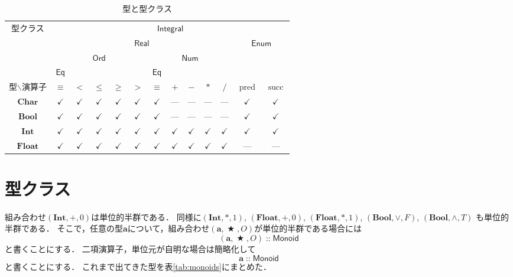 \documentclass[twocolumn]{jsbook}
\newcommand{\hsklType}[1]{\textbf{#1}}
\newcommand{\hsklTypeclass}[1]{\mathsf{#1}}
\DeclareMathOperator{\hsklPred}{pred}
\DeclareMathOperator{\hsklSucc}{succ}
\newcommand{\hsklBool}{\hsklType{Bool}}
\newcommand{\hsklChar}{\hsklType{Char}}
\newcommand{\hsklEnum}{\hsklTypeclass{Enum}}
\newcommand{\hsklInt}{\hsklType{Int}}
\newcommand{\hsklIntegral}{\hsklTypeclass{Integral}}
\newcommand{\hsklEq}{\hsklTypeclass{Eq}}
\newcommand{\hsklFloat}{\hsklType{Float}}
\newcommand{\hsklMonoid}{\hsklTypeclass{Monoid}}
\newcommand{\hsklNum}{\hsklTypeclass{Num}}
\newcommand{\hsklOrd}{\hsklTypeclass{Ord}}
\newcommand{\hsklReal}{\hsklTypeclass{Real}}
\DeclareMathOperator{\mathAnyBinaryOperator}{\bigstar}
\DeclareMathOperator{\mathIn}{::}
\newcommand{\mathMonoid}[3]{(#1,#2,#3)}
\begin{document}
\begin{table*}
\caption{型と型クラス}
\label{tab:type-and-typeclass}
\begin{center}
\begin{tabular}{||c||c|c|c|c|c|c|c|c|c|c|c|c||}
\hline
\multirow{4}{*}{型クラス}
    &\multicolumn{12}{|c||}{$\hsklIntegral$}\\
\cline{2-13}
\multirow{3}{*}{}
    &\multicolumn{10}{|c|}{$\hsklReal$}
    &\multicolumn{2}{|c||}{$\hsklEnum$}\\
\cline{2-11}
\multirow{2}{*}{}
    &\multicolumn{5}{|c|}{$\hsklOrd$}
    &\multicolumn{5}{|c|}{$\hsklNum$}
    &\multicolumn{2}{|c||}{ }\\
\cline{2-2}\cline{7-7}
{ }
    &$\hsklEq$
    &\multicolumn{4}{|c|}{ }
    &$\hsklEq$
    &\multicolumn{4}{|c|}{ }
    &\multicolumn{2}{|c||}{ }\\
\hline\hline
型$\backslash$演算子
    &$\equiv$
    &$<$
    &$\le$
    &$\ge$
    &$>$
    &$\equiv$
    &$+$
    &$-$
    &$*$
    &$/$
    &$\hsklPred$
    &$\hsklSucc$\\
\hline
$\hsklChar$
    &$\checkmark$
    &$\checkmark$
    &$\checkmark$
    &$\checkmark$
    &$\checkmark$
    &$\checkmark$
    &---
    &---
    &---
    &---
    &$\checkmark$
    &$\checkmark$\\
\hline
$\hsklBool$
    &$\checkmark$
    &$\checkmark$
    &$\checkmark$
    &$\checkmark$
    &$\checkmark$
    &$\checkmark$
    &---
    &---
    &---
    &---
    &$\checkmark$
    &$\checkmark$\\
\hline
$\hsklInt$
    &$\checkmark$
    &$\checkmark$
    &$\checkmark$
    &$\checkmark$
    &$\checkmark$
    &$\checkmark$
    &$\checkmark$
    &$\checkmark$
    &$\checkmark$
    &$\checkmark$
    &$\checkmark$
    &$\checkmark$\\
\hline
$\hsklFloat$
    &$\checkmark$
    &$\checkmark$
    &$\checkmark$
    &$\checkmark$
    &$\checkmark$
    &$\checkmark$
    &$\checkmark$
    &$\checkmark$
    &$\checkmark$
    &$\checkmark$
    &---
    &---\\
\hline
\end{tabular}
\end{center}
\end{table*}

\section{型クラス}

組み合わせ$\mathMonoid{\hsklInt}{+}{0}$は単位的半群である．
同様に$\mathMonoid{\hsklInt}{*}{1}$, $\mathMonoid{\hsklFloat}{+}{0}$, $\mathMonoid{\hsklFloat}{*}{1}$, $\mathMonoid{\hsklBool}{\vee}{F}$, $\mathMonoid{\hsklBool}{\wedge}{T}$ も単位的半群である．
そこで，任意の型$\hsklType{a}$について，組み合わせ$\mathMonoid{\hsklType{a}}{\mathAnyBinaryOperator}{O}$が単位的半群である場合には$$\mathMonoid{\hsklType{a}}{\mathAnyBinaryOperator}{O}\mathIn\hsklMonoid$$と書くことにする．
二項演算子，単位元が自明な場合は簡略化して$$\hsklType{a}\mathIn\hsklMonoid$$と書くことにする．
これまで出てきた型を表\ref{tab:monoids}にまとめた．
\end{document}
